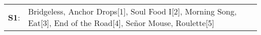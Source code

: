 \begin{supertabular}{p{0.03\textwidth}p{0.92\textwidth}}
 \textbf{S1}:  &  Bridgeless\textsuperscript{}, \enspace Anchor Drops[1]\textsuperscript{}, \enspace Soul Food I[2]\textsuperscript{}, \enspace Morning Song\textsuperscript{}, \enspace Eat[3]\textsuperscript{}, \enspace End of the Road[4]\textsuperscript{}, \enspace Señor Mouse\textsuperscript{}, \enspace Roulette[5]\textsuperscript{}  \enspace  \\
\end{supertabular}
